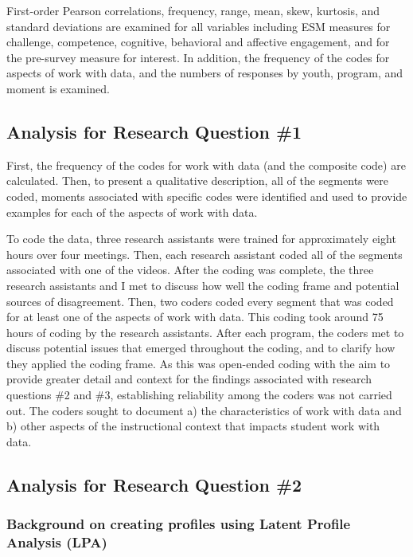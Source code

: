 \documentclass[]{book}
\theoremstyle{definition}
\theoremstyle{definition}
\theoremstyle{definition}
\theoremstyle{remark}
\begin{document}
First-order Pearson correlations, frequency, range, mean, skew,
kurtosis, and standard deviations are examined for all variables
including ESM measures for challenge, competence, cognitive, behavioral
and affective engagement, and for the pre-survey measure for interest.
In addition, the frequency of the codes for aspects of work with data,
and the numbers of responses by youth, program, and moment is examined.

\subsection{Analysis for Research Question
\#1}\label{analysis-for-research-question-1}

First, the frequency of the codes for work with data (and the composite
code) are calculated. Then, to present a qualitative description, all of
the segments were coded, moments associated with specific codes were
identified and used to provide examples for each of the aspects of work
with data.

To code the data, three research assistants were trained for
approximately eight hours over four meetings. Then, each research
assistant coded all of the segments associated with one of the videos.
After the coding was complete, the three research assistants and I met
to discuss how well the coding frame and potential sources of
disagreement. Then, two coders coded every segment that was coded for at
least one of the aspects of work with data. This coding took around 75
hours of coding by the research assistants. After each program, the
coders met to discuss potential issues that emerged throughout the
coding, and to clarify how they applied the coding frame. As this was
open-ended coding with the aim to provide greater detail and context for
the findings associated with research questions \#2 and \#3,
establishing reliability among the coders was not carried out. The
coders sought to document a) the characteristics of work with data and
b) other aspects of the instructional context that impacts student work
with data.

\subsection{Analysis for Research Question
\#2}\label{analysis-for-research-question-2}

\subsubsection{Background on creating profiles using Latent Profile
Analysis
(LPA)}\label{background-on-creating-profiles-using-latent-profile-analysis-lpa}
\end{document}
